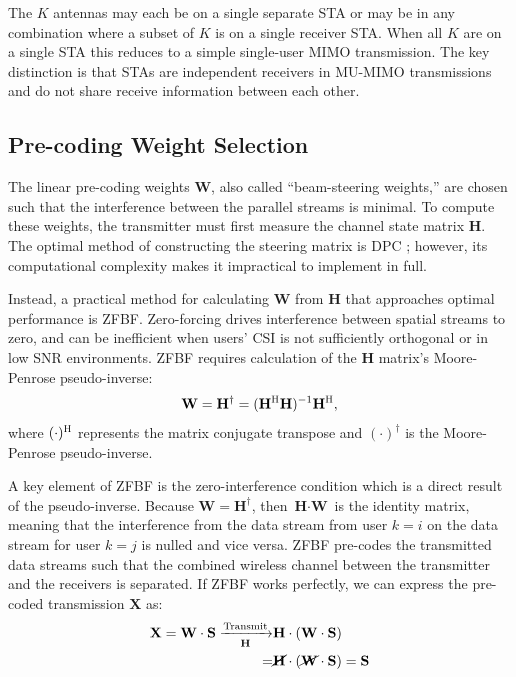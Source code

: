 	The $K$ antennas may each be on a single separate \ac{STA} or may be in any combination where a subset of $K$ is on a single receiver \ac{STA}.
	When all $K$ are on a single \ac{STA} this reduces to a simple single-user \ac{MIMO} transmission.
	The key distinction is that \acp{STA} are independent receivers in \ac{MU-MIMO} transmissions and do not share receive information between each other.


\subsection{Pre-coding Weight Selection}
	The linear pre-coding weights $\textbf{W}$, also called ``beam-steering weights,'' are chosen such that the interference between the parallel streams is minimal.  
	To compute these weights, the transmitter must first measure the channel state matrix $\textbf{H}$.
	The optimal method of constructing the steering matrix is \acf{DPC} \cite{costa1983dpc}; however, its computational complexity makes it impractical to implement in full. 
	
	
	Instead, a practical method for calculating $\mathbf{W}$ from $\mathbf{H}$ that approaches optimal performance is \ac{ZFBF}\cite{goldsmith2006zf}.  
 Zero-forcing drives interference between spatial streams to zero, and can be inefficient when users' \ac{CSI} is not sufficiently orthogonal \cite{aryafar2010design} or in low \ac{SNR} environments.
 \ac{ZFBF} requires calculation of the $\mathbf{H}$ matrix's Moore-Penrose pseudo-inverse:
\begin{equation}
\mathbf{W} = \mathbf{H}^\dagger =  (\mathbf{H}^\textsc{H} \mathbf{H})^{-1} \mathbf{H}^\textsc{H}, \label{eq:zf}
\end{equation}
where $(\cdot)^\textsc{H}$ represents the matrix conjugate transpose and $(\cdot)^\dagger$ is the Moore-Penrose pseudo-inverse.

	A key element of \ac{ZFBF} is the zero-interference condition which is a direct result of the pseudo-inverse.
	Because $\textbf{W}=\textbf{H}^\dagger$, then $\textbf{H}\cdot\textbf{W}$ is the identity matrix, meaning that the interference from the data stream from user $k=i$ on the data stream for user $k=j$ is nulled and vice versa.
	\ac{ZFBF} pre-codes the transmitted data streams such that the combined wireless channel between the transmitter and the receivers is separated.
	If \ac{ZFBF} works perfectly, we can express the pre-coded transmission $\mathbf{X}$ as:
\begin{align}
\mathbf{X} = \mathbf{W} \cdot \mathbf{S} \xrightarrow[\mathbf{H}]{\text{Transmit}} & \mathbf{H}\cdot (\mathbf{W} \cdot \mathbf{S}) \notag \\
 = & \cancel{\mathbf{H}} \cdot (\cancel{\mathbf{W}} \cdot \mathbf{S}) = \mathbf{S}
\end{align}

